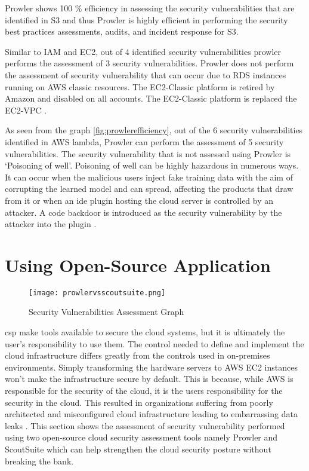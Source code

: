 \par Prowler shows 100 \% efficiency in assessing the security vulnerabilities that are identified in S3 and thus Prowler is highly efficient in performing the security best practices assessments, audits, and incident response for S3.

\par Similar to IAM and EC2, out of 4 identified security
vulnerabilities prowler performs the assessment of 3 security vulnerabilities.
Prowler does not perform the assessment of security vulnerability that can occur due to RDS instances running on AWS classic resources.
The EC2-Classic platform is retired by Amazon and disabled on all accounts.
The EC2-Classic platform is replaced the EC2-VPC \cite{91}.

\par As seen from the graph \ref{fig:prowlerefficiency}, out of the 6 security vulnerabilities identified in AWS lambda, Prowler can perform the assessment of 5 security vulnerabilities.
The security vulnerability that is not assessed using Prowler is ‘Poisoning of well’.
Poisoning of well can be highly hazardous in numerous ways.
It can occur when the malicious users inject fake
training
data with the aim of corrupting the learned model and can
spread, affecting the products that draw from it or when
an \gls{ide} plugin
hosting the cloud server is controlled by an attacker.
A code backdoor is introduced as the security
vulnerability by the attacker into the plugin \cite{72}.


\section{Using Open-Source Application}

\begin{figure}
    \centering
    \texttt{[image: prowlervsscoutsuite.png]}
    \caption{Security Vulnerabilities Assessment Graph}
    \label{fig:prowlervsscoutsuite}
\end{figure}

\par \gls{csp} make tools available to secure the cloud
systems,
but it is ultimately the user’s responsibility to use them.
The control needed to define and implement the cloud infrastructure differs greatly from the controls used in on-premises environments.
Simply transforming the hardware servers to AWS EC2 instances won't make the infrastructure secure by default.
This is because, while AWS is responsible for the
security of the cloud, it is the users responsibility
for the security in the cloud.
This resulted in organizations suffering from poorly
architected and misconfigured cloud infrastructure
leading to embarrassing data leaks \cite{92}.
This section shows the assessment of security vulnerability performed using two open-source cloud security assessment tools namely Prowler and ScoutSuite which can help strengthen the cloud security posture without breaking the bank.

